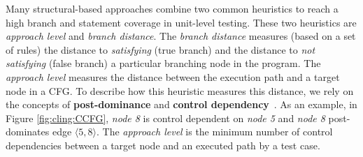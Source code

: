  
%    





Many structural-based approaches combine two common heuristics to reach a high branch and statement coverage in unit-level testing. These two heuristics  are \textit{approach level} and \textit{branch distance}.
The \textit{branch distance} measures (based on a set of rules) the distance to \textit{satisfying} (true branch) and the distance to \textit{not satisfying} (false branch) a particular branching node in the program.
The \textit{approach level} measures the distance between the execution path and a target node in a CFG. To describe how this heuristic measures this distance, we 
rely on the concepts of \textbf{post-dominance} and \textbf{control dependency}~\cite{Allen:1970:CFA:800028.808479}.
%
%
As an example, in Figure \ref{fig:cling:CCFG}, \textit{node 8} is control dependent on \textit{node 5} and \textit{node 8} post-dominates edge $\langle 5,8\rangle$. %
The \textit{approach level} is the minimum number of control dependencies between a target node and an executed path by a test case. 

